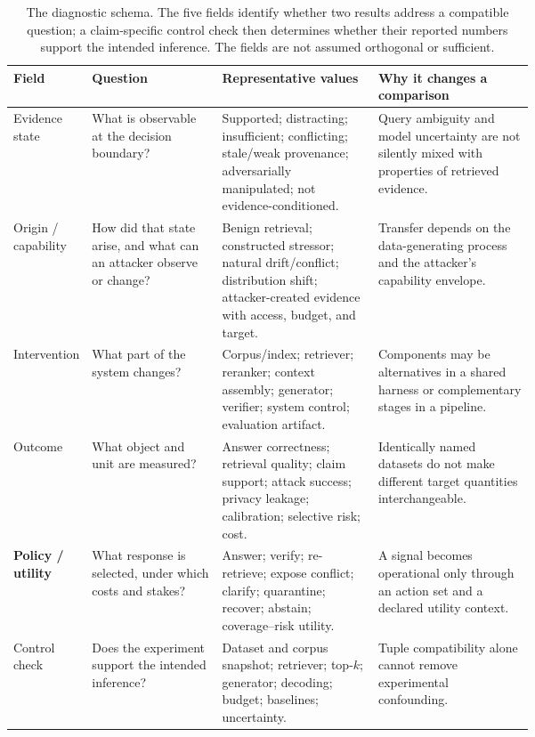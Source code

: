 \begin{table}[t]
\centering
\small
\renewcommand{\arraystretch}{0.92}
\begin{tabularx}{\linewidth}{>{\raggedright\arraybackslash}p{0.13\linewidth}>{\raggedright\arraybackslash}p{0.25\linewidth}>{\raggedright\arraybackslash}p{0.30\linewidth}X}
\toprule
\textbf{Field} & \textbf{Question} & \textbf{Representative values} & \textbf{Why it changes a comparison} \\
\midrule
Evidence state & What is observable at the decision boundary? & Supported; distracting; insufficient; conflicting; stale/weak provenance; adversarially manipulated; not evidence-conditioned. & Query ambiguity and model uncertainty are not silently mixed with properties of retrieved evidence. \\
Origin / capability & How did that state arise, and what can an attacker observe or change? & Benign retrieval; constructed stressor; natural drift/conflict; distribution shift; attacker-created evidence with access, budget, and target. & Transfer depends on the data-generating process and the attacker's capability envelope. \\
Intervention & What part of the system changes? & Corpus/index; retriever; reranker; context assembly; generator; verifier; system control; evaluation artifact. & Components may be alternatives in a shared harness or complementary stages in a pipeline. \\
Outcome & What object and unit are measured? & Answer correctness; retrieval quality; claim support; attack success; privacy leakage; calibration; selective risk; cost. & Identically named datasets do not make different target quantities interchangeable. \\
\textbf{Policy / utility} & What response is selected, under which costs and stakes? & Answer; verify; re-retrieve; expose conflict; clarify; quarantine; recover; abstain; coverage--risk utility. & A signal becomes operational only through an action set and a declared utility context. \\
\midrule
Control check & Does the experiment support the intended inference? & Dataset and corpus snapshot; retriever; top-$k$; generator; decoding; budget; baselines; uncertainty. & Tuple compatibility alone cannot remove experimental confounding. \\
\bottomrule
\end{tabularx}
\caption{The diagnostic schema. The five fields identify whether two results address a compatible question; a claim-specific control check then determines whether their reported numbers support the intended inference. The fields are not assumed orthogonal or sufficient.}
\label{tab:main-framework-overview}
\end{table}
